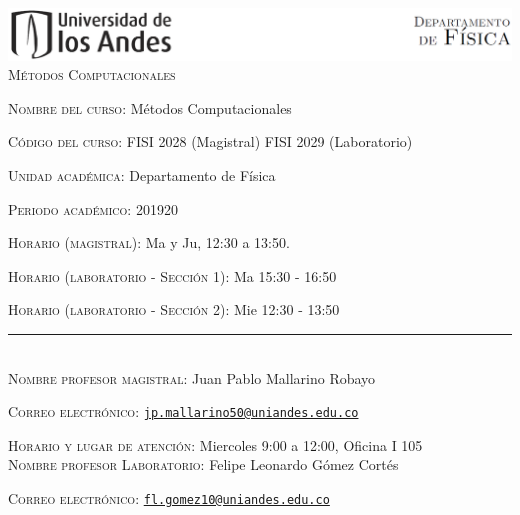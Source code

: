 \documentclass[letterpaper,10pt,onecolumn]{article}
\begin{document}
\begin{center}

\includegraphics[width=490pt]{../imagenes/header.png}\\[0.5cm]

\textsc{\LARGE M\'etodos Computacionales}\\[0.1cm]

\end{center}

\large \noindent\textsc{Nombre del curso:}  M\'etodos Computacionales%
  
\noindent\textsc{C\'odigo del curso:} FISI 2028 (Magistral) FISI 2029 (Laboratorio) %

\noindent\textsc{Unidad acad\'emica:} Departamento de F\'isica

\noindent\textsc{Periodo acad\'emico:} 201920 %

\noindent\textsc{Horario (magistral):} Ma y Ju, 12:30 a 13:50.

\noindent\textsc{Horario (laboratorio - Secci\'on 1):} Ma 15:30 - 16:50

\noindent\textsc{Horario (laboratorio - Secci\'on 2):} Mie 12:30 - 13:50

\noindent\rule{\textwidth}{1pt}\\[-0.3cm]

\normalsize \noindent\textsc{Nombre profesor magistral:}
Juan Pablo Mallarino Robayo%

\noindent\textsc{Correo electr\'onico:}
\href{mailto:jp.mallarino50@uniandes.edu.co}{\nolinkurl{jp.mallarino50@uniandes.edu.co}}

\noindent\textsc{Horario y lugar de atenci\'on:} Miercoles 9:00 a 12:00, Oficina I 105 \\[-0.1cm]

\normalsize \noindent\textsc{Nombre profesor Laboratorio:}
Felipe Leonardo G\'omez Cort\'es %

\noindent\textsc{Correo electr\'onico:}
\href{mailto:fl.gomez10@uniandes.edu.co}{\nolinkurl{fl.gomez10@uniandes.edu.co}}
\end{document}
